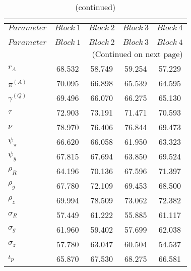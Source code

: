  
\begin{center}
\begin{longtable}{lcccc} 
\caption{MCMC Inefficiency factors per block}\\
 \label{Table:MCMC_inefficiency_factors}\\
\toprule 
$Parameter         $	 & 	 $     Block~1$	 & 	 $     Block~2$	 & 	 $     Block~3$	 & 	 $     Block~4$\\
\midrule \endfirsthead 
\caption{(continued)}\\
 \toprule \\ 
$Parameter         $	 & 	 $     Block~1$	 & 	 $     Block~2$	 & 	 $     Block~3$	 & 	 $     Block~4$\\
\midrule \endhead 
\midrule \multicolumn{5}{r}{(Continued on next page)} \\ \bottomrule \endfoot 
\bottomrule \endlastfoot 
$ {r_{A}}          $	 & 	      68.532	 & 	      58.749	 & 	      59.254	 & 	      57.229 \\ 
$ {\pi^{(A)}}      $	 & 	      70.095	 & 	      66.898	 & 	      65.539	 & 	      64.595 \\ 
$ {\gamma^{(Q)}}   $	 & 	      69.496	 & 	      66.070	 & 	      66.275	 & 	      65.130 \\ 
$ {\tau}           $	 & 	      72.903	 & 	      73.191	 & 	      71.471	 & 	      70.593 \\ 
$ {\nu}            $	 & 	      78.970	 & 	      76.406	 & 	      76.844	 & 	      69.473 \\ 
$ {\psi_\pi}       $	 & 	      66.620	 & 	      66.058	 & 	      61.950	 & 	      63.323 \\ 
$ {\psi_y}         $	 & 	      67.815	 & 	      67.694	 & 	      63.850	 & 	      69.524 \\ 
$ {\rho_R}         $	 & 	      64.196	 & 	      70.136	 & 	      67.596	 & 	      71.397 \\ 
$ {\rho_{g}}       $	 & 	      67.780	 & 	      72.109	 & 	      69.453	 & 	      68.500 \\ 
$ {\rho_z}         $	 & 	      69.994	 & 	      78.509	 & 	      73.062	 & 	      72.382 \\ 
$ {\sigma_R}       $	 & 	      57.449	 & 	      61.222	 & 	      55.885	 & 	      61.117 \\ 
$ {\sigma_{g}}     $	 & 	      61.960	 & 	      59.402	 & 	      57.699	 & 	      62.038 \\ 
$ {\sigma_z}       $	 & 	      57.780	 & 	      63.047	 & 	      60.504	 & 	      54.537 \\ 
$ {\iota_p}        $	 & 	      65.870	 & 	      67.530	 & 	      68.275	 & 	      66.581 \\ 
\end{longtable}
 \end{center}
